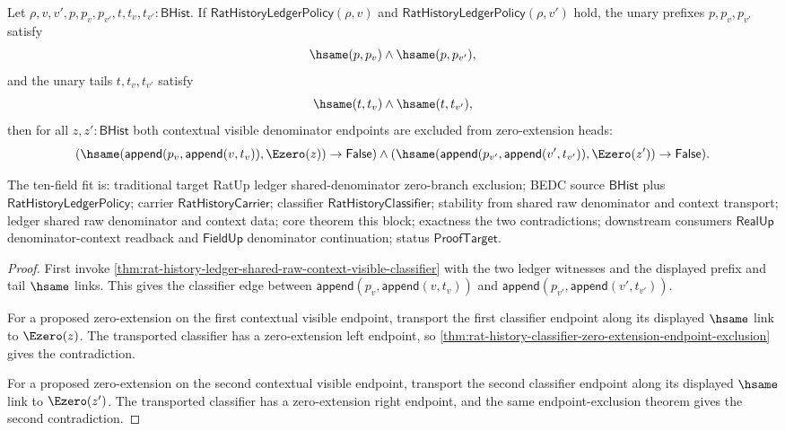 \begin{theorem}
\label{thm:rat-history-ledger-shared-raw-context-zero-extension-endpoint-exclusion}
Let $\rho,v,v',p,p_v,p_{v'},t,t_v,t_{v'}:\mathsf{BHist}$. If
$\mathsf{RatHistoryLedgerPolicy}(\rho,v)$ and
$\mathsf{RatHistoryLedgerPolicy}(\rho,v')$ hold, the unary prefixes
$p,p_v,p_{v'}$ satisfy
$$
\hsame(p,p_v)\land \hsame(p,p_{v'}),
$$
and the unary tails $t,t_v,t_{v'}$ satisfy
$$
\hsame(t,t_v)\land \hsame(t,t_{v'}),
$$
then for all $z,z':\mathsf{BHist}$ both contextual visible denominator
endpoints are excluded from zero-extension heads:
$$
(\hsame(\mathsf{append}(p_v,\mathsf{append}(v,t_v)),\Ezero(z))\to\mathsf{False})
\land
(\hsame(\mathsf{append}(p_{v'},\mathsf{append}(v',t_{v'})),\Ezero(z'))\to\mathsf{False}).
$$

The ten-field fit is: traditional target RatUp ledger shared-denominator
zero-branch exclusion; BEDC source $\mathsf{BHist}$ plus
$\mathsf{RatHistoryLedgerPolicy}$; carrier $\mathsf{RatHistoryCarrier}$;
classifier $\mathsf{RatHistoryClassifier}$; stability from shared raw
denominator and context transport; ledger shared raw denominator and context
data; core theorem this block; exactness the two contradictions; downstream
consumers $\mathsf{RealUp}$ denominator-context readback and
$\mathsf{FieldUp}$ denominator continuation; status $\mathsf{ProofTarget}$.
\end{theorem}
\begin{proof}
First invoke
\autoref{thm:rat-history-ledger-shared-raw-context-visible-classifier} with
the two ledger witnesses and the displayed prefix and tail $\hsame$ links. This
gives the classifier edge between
$\mathsf{append}(p_v,\mathsf{append}(v,t_v))$ and
$\mathsf{append}(p_{v'},\mathsf{append}(v',t_{v'}))$.

For a proposed zero-extension on the first contextual visible endpoint,
transport the first classifier endpoint along its displayed $\hsame$ link to
$\Ezero(z)$. The transported classifier has a zero-extension left endpoint, so
\autoref{thm:rat-history-classifier-zero-extension-endpoint-exclusion} gives
the contradiction.

For a proposed zero-extension on the second contextual visible endpoint,
transport the second classifier endpoint along its displayed $\hsame$ link to
$\Ezero(z')$. The transported classifier has a zero-extension right endpoint,
and the same endpoint-exclusion theorem gives the second contradiction.
\end{proof}

